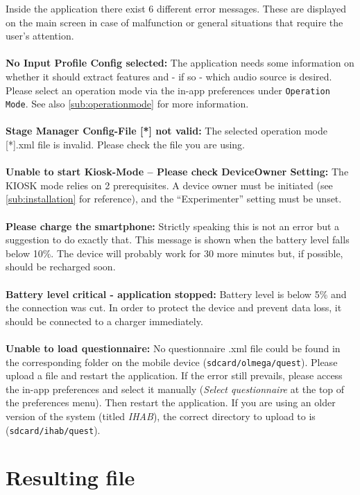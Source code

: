 \documentclass[11pt,a4paper,titlepage]{article}
\begin{document}
Inside the application there exist 6 different error messages. These are displayed on the main screen in case of malfunction or general situations that require the user's attention.\\
\\
\textbf{No Input Profile Config selected:} The application needs some information on whether it should extract features and - if so - which audio source is desired. Please select an operation mode via the in-app preferences under \texttt{Operation Mode}. See also \ref{sub:operationmode} for more information. \\
\\
\textbf{Stage Manager Config-File [*] not valid:} The selected operation mode [*].xml file is invalid. Please check the file you are using.\\
\\
\textbf{Unable to start Kiosk-Mode -- Please check DeviceOwner Setting:} The KIOSK mode relies on 2 prerequisites. A device owner must be initiated (see \ref{sub:installation} for reference), and the ``Experimenter'' setting must be unset.\\
\\
\textbf{Please charge the smartphone:} Strictly speaking this is not an error but a suggestion to do exactly that. This message is shown when the battery level falls below 10\%. The device will probably work for 30 more minutes but, if possible, should be recharged soon.\\
\\
\textbf{Battery level critical - application stopped:} Battery level is below 5\% and the connection was cut. In order to protect the device and prevent data loss, it should be connected to a charger immediately.\\
\\
\textbf{Unable to load questionnaire:} No questionnaire .xml file could be found in the corresponding folder on the mobile device (\texttt{sdcard/olmega/quest}). Please upload a file and restart the application. If the error still prevails, please access the in-app preferences and select it manually (\emph{Select questionnaire} at the top of the preferences menu). Then restart the application. If you are using an older version of the system (titled \emph{IHAB}), the correct directory to upload to is (\texttt{sdcard/ihab/quest}).

\clearpage

\section{Resulting file}
\end{document}
